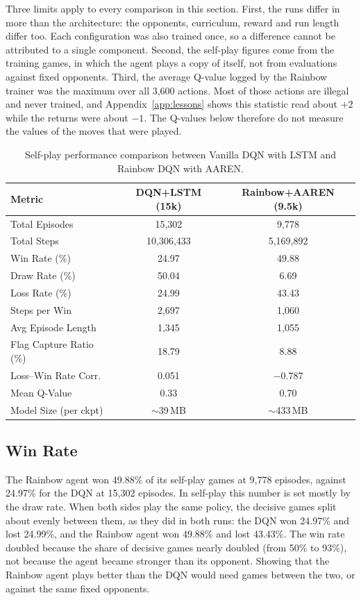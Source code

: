 Three limits apply to every comparison in this section. First, the runs differ in more than the architecture: the opponents, curriculum, reward and run length differ too. Each configuration was also trained once, so a difference cannot be attributed to a single component. Second, the self-play figures come from the training games, in which the agent plays a copy of itself, not from evaluations against fixed opponents. Third, the average Q-value logged by the Rainbow trainer was the maximum over all 3,600 actions. Most of those actions are illegal and never trained, and Appendix~\ref{app:lessons} shows this statistic read about $+2$ while the returns were about $-1$. The Q-values below therefore do not measure the values of the moves that were played.

\begin{table}[htbp]
\centering
\caption{Self-play performance comparison between Vanilla DQN with LSTM and Rainbow DQN with AAREN.}
\label{tab:arch_comparison}
\begin{tabular}{l c c}
\hline
\textbf{Metric} & \textbf{DQN+LSTM (15k)} & \textbf{Rainbow+AAREN (9.5k)} \\ \hline
Total Episodes         & 15,302   & 9,778    \\
Total Steps            & 10,306,433 & 5,169,892 \\
Win Rate (\%)          & 24.97    & 49.88    \\
Draw Rate (\%)         & 50.04    & 6.69     \\
Loss Rate (\%)         & 24.99    & 43.43    \\
Steps per Win          & 2,697    & 1,060    \\
Avg Episode Length     & 1,345    & 1,055    \\
Flag Capture Ratio (\%)& 18.79   & 8.88     \\
Loss--Win Rate Corr.   & 0.051   & $-$0.787 \\
Mean Q-Value           & 0.33    & 0.70     \\
Model Size (per ckpt)  & $\sim$39\,MB & $\sim$433\,MB \\
\hline
\end{tabular}
\end{table}

\subsection{Win Rate }\label{finding:7}
The Rainbow agent won 49.88\% of its self-play games at 9,778 episodes, against 24.97\% for the DQN at 15,302 episodes. In self-play this number is set mostly by the draw rate. When both sides play the same policy, the decisive games split about evenly between them, as they did in both runs: the DQN won 24.97\% and lost 24.99\%, and the Rainbow agent won 49.88\% and lost 43.43\%. The win rate doubled because the share of decisive games nearly doubled (from 50\% to 93\%), not because the agent became stronger than its opponent. Showing that the Rainbow agent plays better than the DQN would need games between the two, or against the same fixed opponents.

